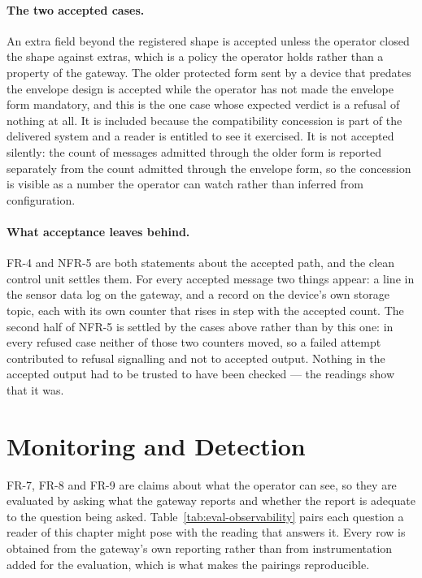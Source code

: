 \documentclass[12pt,a4paper]{report}
\begin{document}
\paragraph{The two accepted cases.}
An extra field beyond the registered shape is accepted
unless the operator closed the shape against extras, which
is a policy the operator holds rather than a property of the
gateway. The older protected form sent by a device that
predates the envelope design is accepted while the operator
has not made the envelope form mandatory, and this is the
one case whose expected verdict is a refusal of nothing at
all. It is included because the compatibility concession is
part of the delivered system and a reader is entitled to see
it exercised. It is not accepted silently: the count of
messages admitted through the older form is reported
separately from the count admitted through the envelope
form, so the concession is visible as a number the operator
can watch rather than inferred from configuration.

\paragraph{What acceptance leaves behind.}
FR-4 and NFR-5 are both statements about the accepted path,
and the clean control unit settles them. For every accepted
message two things appear: a line in the sensor data log on
the gateway, and a record on the device's own storage topic,
each with its own counter that rises in step with the
accepted count. The second half of NFR-5 is settled by the
cases above rather than by this one: in every refused case
neither of those two counters moved, so a failed attempt
contributed to refusal signalling and not to accepted
output. Nothing in the accepted output had to be trusted to
have been checked --- the readings show that it was.

\section{Monitoring and Detection}
\label{sec:eval-monitoring}

FR-7, FR-8 and FR-9 are claims about what the operator can
see, so they are evaluated by asking what the gateway
reports and whether the report is adequate to the question
being asked. Table~\ref{tab:eval-observability} pairs each
question a reader of this chapter might pose with the
reading that answers it. Every row is obtained from the
gateway's own reporting rather than from instrumentation
added for the evaluation, which is what makes the pairings
reproducible.
\end{document}
